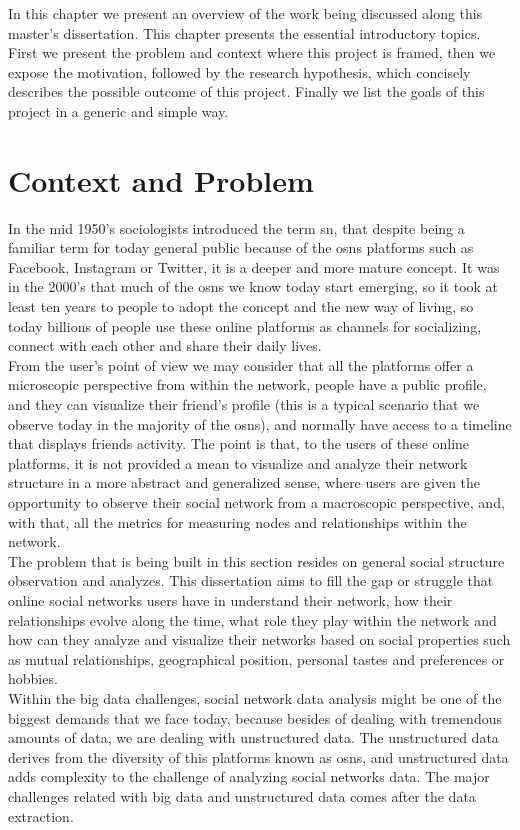 In this chapter we present an overview of the work being discussed along this master's dissertation. This chapter presents the essential introductory topics. First we present the problem and context where this project is framed, then we expose the motivation, followed by the research hypothesis, which concisely describes the possible outcome of this project. Finally we list the goals of this project in a generic and simple way.

\section{Context and Problem}

In the mid 1950's sociologists introduced the term \acrfull{sn}, that despite being a familiar term for today general public because of the \glspl{osn} platforms such as Facebook, Instagram or Twitter, it is a deeper and more mature concept. It was in the 2000's that much of the \glspl{osn} we know today start emerging, so it took at least ten years to people to adopt the concept and the new way of living, so today billions of people use these online platforms as channels for socializing, connect with each other and share their daily lives.\\
\indent From the user's point of view we may consider that all the platforms offer a microscopic perspective from within the network, people have a public profile, and they can visualize their friend's profile (this is a typical scenario that we observe today in the majority of the \glspl{osn}), and normally have access to a timeline that displays friends activity. The point is that, to the users of these online platforms, it is not provided a mean to visualize and analyze their network structure in a more abstract and generalized sense, where users are given the opportunity to observe their social network from a macroscopic perspective, and, with that, all the metrics for measuring nodes and relationships within the network.\\
\indent The problem that is being built in this section resides on general social structure observation and analyzes. This dissertation aims to fill the gap or struggle that online social networks users have in understand their network, how their relationships evolve along the time, what role they play within the network and how can they analyze and visualize their networks based on social properties such as mutual relationships, geographical position, personal tastes and preferences or hobbies.\\
\indent Within the big data challenges, social network data analysis might be one of the biggest demands that we face today, because besides of dealing with tremendous amounts of data, we are dealing with unstructured data. The unstructured data derives from the diversity of this platforms known as \glspl{osn}, and unstructured data adds complexity to the challenge of analyzing social networks data. The major challenges related with big data and unstructured data comes after the data extraction.

